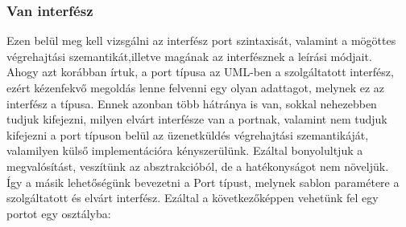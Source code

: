 \documentclass[a4paper,12pt]{report}
\begin{document}
\subsubsection{Van interfész}
Ezen belül meg kell vizsgálni az interfész port szintaxisát, valamint a mögöttes végrehajtási szemantikát,illetve magának az interfésznek a leírási módjait. \\
Ahogy azt korábban írtuk, a port típusa az UML-ben a szolgáltatott interfész, ezért kézenfekvő megoldás lenne felvenni egy olyan adattagot, melynek ez az interfész a típusa. Ennek azonban több hátránya is van, sokkal nehezebben tudjuk kifejezni, milyen elvárt interfésze van a portnak, valamint nem tudjuk kifejezni a port típuson belül az üzenetküldés végrehajtási szemantikáját, valamilyen külső implementációra kényszerülünk. Ezáltal bonyolultjuk a megvalósítást, veszítünk az absztrakcióból, de a hatékonyságot nem növeljük. \\
Így a másik lehetőségünk bevezetni a Port típust, melynek sablon paramétere a szolgáltatott és elvárt interfész. Ezáltal a következőképpen vehetünk fel egy portot egy osztályba: \\


%
\end{document}
